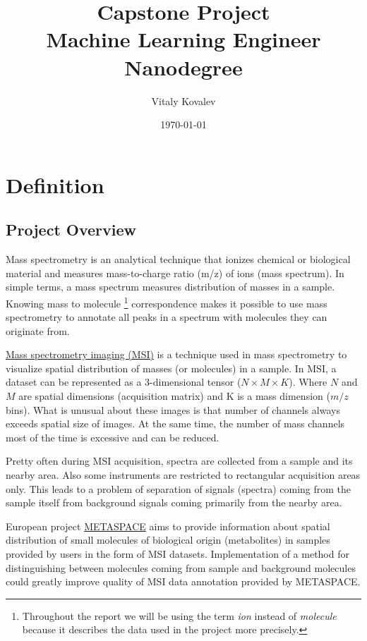 \documentclass[a4paper]{article}
\title{Capstone Project\\
    \small Machine Learning Engineer Nanodegree}
\author{Vitaly Kovalev}
\date {\today}
\begin{document}
\maketitle

\section{Definition}
\subsection*{Project Overview}

Mass spectrometry is an analytical technique that ionizes chemical or biological material and
measures mass-to-charge ratio (m/z) of ions (mass spectrum). In simple terms, a mass spectrum
measures distribution of masses in a sample. Knowing mass to molecule
\footnote{Throughout the report we will be using the term \textit{ion} instead of \textit{molecule}
because it describes the data used in the project more precisely.}
correspondence makes it possible to use mass spectrometry to annotate all peaks in a spectrum with
molecules they can originate from.

\href{https://ms-imaging.org/wp/}{Mass spectrometry imaging (MSI)} is a technique used 
in mass spectrometry to visualize
spatial distribution of masses (or molecules) in a sample. In MSI, a dataset can be represented as
a 3-dimensional tensor ($N \times M \times K$). Where $N$ and $M$ are spatial dimensions
(acquisition matrix) and K is a mass dimension ($m/z$ bins). What is unusual about these images
is that number of channels always exceeds spatial size of images. At the same time, the number
of mass channels most of the time is excessive and can be reduced.

Pretty often during MSI acquisition, spectra are collected from a sample and its nearby area.
Also some instruments are restricted to rectangular acquisition areas only.
This leads to a problem of separation of signals (spectra) coming from the sample itself
from background signals coming primarily from the nearby area.

European project \href{http://metaspace2020.eu}{METASPACE} aims to provide information about
spatial distribution of small molecules of biological origin (metabolites) in
samples provided by users in the form of MSI datasets. Implementation of a method for
distinguishing between molecules coming from sample and background molecules could greatly
improve quality of MSI data annotation provided by METASPACE.
\end{document}
